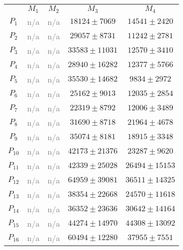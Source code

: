\documentclass[anon]{CI}
\begin{document}
		\begin{table}[H]
			\centering
			\def\arraystretch{1.5}
			\scriptsize
			\begin{tabular}{ccccc}
				
				& $M_{1}$  & $M_{2}$  & $M_{3}$  & $M_{4}$ \\ \cline{2-5}
				$P_{1}$  & \textcolor{gray}{n/a}  & \textcolor{gray}{n/a}  & $18124\pm7069$  & $14541\pm2420$ \\
				$P_{2}$  & \textcolor{gray}{n/a}  & \textcolor{gray}{n/a}  & $29057\pm8731$  & $11242\pm2781$ \\
				$P_{3}$  & \textcolor{gray}{n/a}  & \textcolor{gray}{n/a}  & $33583\pm11031$  & $12570\pm3410$ \\
				$P_{4}$  & \textcolor{gray}{n/a}  & \textcolor{gray}{n/a}  & $28940\pm16282$  & $12377\pm5766$ \\
				$P_{5}$  & \textcolor{gray}{n/a}  & \textcolor{gray}{n/a}  & $35530\pm14682$  & $9834\pm2972$ \\
				$P_{6}$  & \textcolor{gray}{n/a}  & \textcolor{gray}{n/a}  & $25162\pm9013$  & $12035\pm2854$ \\
				$P_{7}$  & \textcolor{gray}{n/a}  & \textcolor{gray}{n/a}  & $22319\pm8792$  & $12006\pm3489$ \\
				$P_{8}$  & \textcolor{gray}{n/a}  & \textcolor{gray}{n/a}  & $31690\pm8718$  & $21964\pm4678$ \\
				$P_{9}$  & \textcolor{gray}{n/a}  & \textcolor{gray}{n/a}  & $35074\pm8181$  & $18915\pm3348$ \\
				$P_{10}$  & \textcolor{gray}{n/a}  & \textcolor{gray}{n/a}  & $42173\pm21376$  & $23287\pm9620$ \\
				$P_{11}$  & \textcolor{gray}{n/a}  & \textcolor{gray}{n/a}  & $42339\pm25028$  & $26494\pm15153$ \\
				$P_{12}$  & \textcolor{gray}{n/a}  & \textcolor{gray}{n/a}  & $64959\pm39081$  & $36511\pm14325$ \\
				$P_{13}$  & \textcolor{gray}{n/a}  & \textcolor{gray}{n/a}  & $38354\pm22668$  & $24570\pm11618$ \\
				$P_{14}$  & \textcolor{gray}{n/a}  & \textcolor{gray}{n/a}  & $36352\pm23636$  & $30642\pm14164$ \\
				$P_{15}$  & \textcolor{gray}{n/a}  & \textcolor{gray}{n/a}  & $44274\pm14970$  & $44308\pm13092$ \\
				$P_{16}$  & \textcolor{gray}{n/a}  & \textcolor{gray}{n/a}  & $60494\pm12280$  & $37955\pm7551$ \\

\end{tabular}
\end{table}
\end{document}
